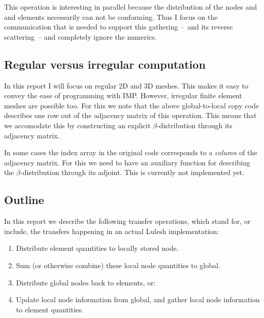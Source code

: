 \documentclass[11pt,fleqn,preprint]{impreport}
\begin{document}
This operation is interesting in parallel because the distribution of
the nodes and and elements necessarily can not be conforming.  Thus I
focus on the communication that is needed to support this gathering
--~and its reverse scattering~-- and completely ignore the numerics.

\subsection{Regular versus irregular computation}

In this report I will focus on regular 2D and 3D meshes. This makes it
easy to convey the ease of programming with \ac{IMP}. However,
irregular finite element meshes are possible too. For this we note
that the above global-to-local copy code describes one row out of the
adjacency matrix of this operation. This means that we accomodate this
by constructing an explicit $\beta$-distribution through its adjacency
matrix.

In some cases the index array in the original code
corresponds to a \emph{column} of the adjacency matrix. For this we
need to have an auxiliary function for describing the
$\beta$-distribution through its adjoint. This is currently not
implemented yet.

\subsection{Outline}

In this report we describe the following transfer operations, which
stand for, or include, the transfers happening in an actual Lulesh
implementation:
\begin{enumerate}
\item\label{e:l2f} Distribute element quantities to locally stored node.
\item\label{f:l2g} Sum (or otherwise combine) these local node quantities to global.
\item\label{f:g2l} Distribute global nodes back to elements, or:
\item\label{e:f2l} Update local node information from global, and
  gather local node information to element quantities.
\end{enumerate}

\end{document}
